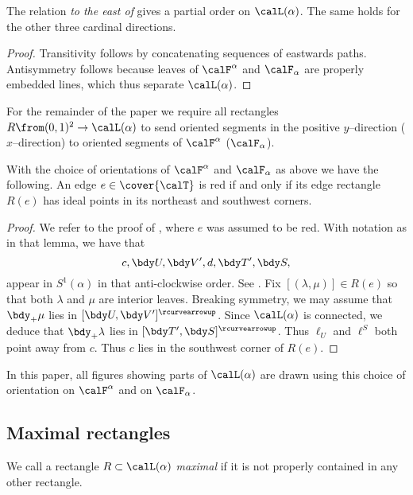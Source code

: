 \documentclass[12pt]{amsart}
\newcommand{\acw}{\rcurvearrowup}
\begin{document}
\begin{lemma}
\label{Lem:PartialOrders} 
The relation \emph{to the east of} gives a partial order on $\calL(\alpha)$.  The same holds for the other three cardinal directions.
\end{lemma}

\begin{proof}
Transitivity follows by concatenating sequences of eastwards paths.  Antisymmetry follows because leaves of $\calF^\alpha$ and $\calF_\alpha$ are properly embedded lines, which thus separate $\calL(\alpha)$.
\end{proof}

For the remainder of the paper we require all rectangles $R \from (0, 1)^2 \to \calL(\alpha)$ to send oriented segments in the positive $y$--direction ($x$--direction) to oriented segments of $\calF^\alpha$ ($\calF_\alpha$).  

\begin{lemma}
\label{Lem:EdgeRectSlope}
With the choice of orientations of $\calF^\alpha$ and $\calF_\alpha$ as above we have the following.  An edge $e \in \cover{\calT}$ is red if and only if its edge rectangle $R(e)$ has ideal points in its northeast and southwest corners. 
\end{lemma}

\begin{proof}
We refer to the proof of , where $e$ was assumed to be red. With notation as in that lemma, we have that 
\[
c, \bdy U, \bdy V', d, \bdy T', \bdy S, 
\]
appear in $S^1(\alpha)$ in that anti-clockwise order. See . Fix $[(\lambda,\mu)] \in R(e)$ so that both $\lambda$ and $\mu$ are interior leaves. Breaking symmetry, we may assume that $\bdy_+ \mu$ lies in $[\bdy U, \bdy V']^\acw$. Since $\calL(\alpha)$ is connected, we deduce that $\bdy_+ \lambda$ lies in $[\bdy T', \bdy S]^\acw$. Thus $\ell_U$ and $\ell^S$ both point away from $c$. Thus $c$ lies in the southwest corner of $R(e)$.
\end{proof}

In this paper, all figures showing parts of $\calL(\alpha)$ are drawn using this choice of orientation on $\calF^\alpha$ and on $\calF_\alpha$.

\subsection{Maximal rectangles}
\label{Sec:MaximalRectangles}

\begin{definition}
\label{Def:MaxRectangle}
We call a rectangle $R \subset \calL(\alpha)$ \emph{maximal} if it is not properly contained in any other rectangle.  
\end{definition}
\end{document}
